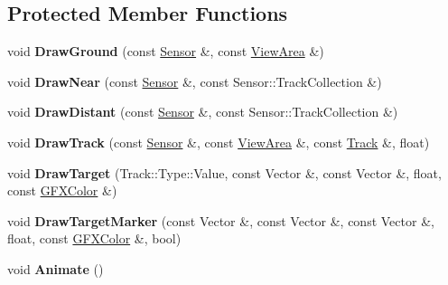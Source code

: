 \subsection*{Protected Member Functions}
\begin{DoxyCompactItemize}
\item 
void {\bfseries Draw\+Ground} (const \hyperlink{classRadar_1_1Sensor}{Sensor} \&, const \hyperlink{structRadar_1_1ViewArea}{View\+Area} \&)\hypertarget{classRadar_1_1PlaneDisplay_a2df2adbae4d4a951bac78c645eacb880}{}\label{classRadar_1_1PlaneDisplay_a2df2adbae4d4a951bac78c645eacb880}

\item 
void {\bfseries Draw\+Near} (const \hyperlink{classRadar_1_1Sensor}{Sensor} \&, const Sensor\+::\+Track\+Collection \&)\hypertarget{classRadar_1_1PlaneDisplay_aac08159f798453cf93a6447e8b72d33c}{}\label{classRadar_1_1PlaneDisplay_aac08159f798453cf93a6447e8b72d33c}

\item 
void {\bfseries Draw\+Distant} (const \hyperlink{classRadar_1_1Sensor}{Sensor} \&, const Sensor\+::\+Track\+Collection \&)\hypertarget{classRadar_1_1PlaneDisplay_ab66f63b2e71737fb297f996b0c2ecbfa}{}\label{classRadar_1_1PlaneDisplay_ab66f63b2e71737fb297f996b0c2ecbfa}

\item 
void {\bfseries Draw\+Track} (const \hyperlink{classRadar_1_1Sensor}{Sensor} \&, const \hyperlink{structRadar_1_1ViewArea}{View\+Area} \&, const \hyperlink{classRadar_1_1Track}{Track} \&, float)\hypertarget{classRadar_1_1PlaneDisplay_acebf5a9f52917e98e3f85e6ac08a3629}{}\label{classRadar_1_1PlaneDisplay_acebf5a9f52917e98e3f85e6ac08a3629}

\item 
void {\bfseries Draw\+Target} (Track\+::\+Type\+::\+Value, const Vector \&, const Vector \&, float, const \hyperlink{structGFXColor}{G\+F\+X\+Color} \&)\hypertarget{classRadar_1_1PlaneDisplay_aee507123a0e08ee7b656c6481d86297f}{}\label{classRadar_1_1PlaneDisplay_aee507123a0e08ee7b656c6481d86297f}

\item 
void {\bfseries Draw\+Target\+Marker} (const Vector \&, const Vector \&, const Vector \&, float, const \hyperlink{structGFXColor}{G\+F\+X\+Color} \&, bool)\hypertarget{classRadar_1_1PlaneDisplay_ae8dbf18b9b7fe005bddc4b1de700d46f}{}\label{classRadar_1_1PlaneDisplay_ae8dbf18b9b7fe005bddc4b1de700d46f}

\item 
void {\bfseries Animate} ()\hypertarget{classRadar_1_1PlaneDisplay_a7a39320b37c35f1b15a6b563b3ef2d85}{}\label{classRadar_1_1PlaneDisplay_a7a39320b37c35f1b15a6b563b3ef2d85}


\end{DoxyCompactItemize}
